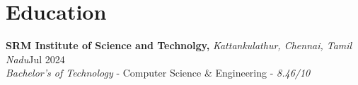 \documentclass[11pt]{article}       %
\begin{document}

\vspace{-18.5pt}

\section*{Education}
\textbf{SRM Institute of Science and Technolgy,} \textit{Kattankulathur, Chennai, Tamil Nadu}\hfill Jul 2024 \\
\textit{Bachelor's of Technology} - Computer Science {\&} Engineering - \textit{8.46/10}
\end{document}
